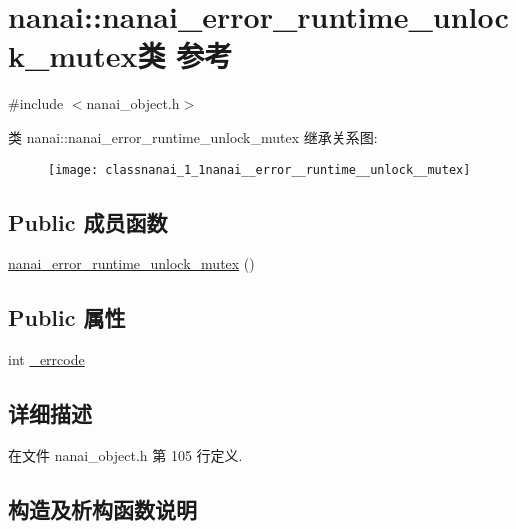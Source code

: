 \hypertarget{classnanai_1_1nanai__error__runtime__unlock__mutex}{}\section{nanai\+:\+:nanai\+\_\+error\+\_\+runtime\+\_\+unlock\+\_\+mutex类 参考}
\label{classnanai_1_1nanai__error__runtime__unlock__mutex}


{\ttfamily \#include $<$nanai\+\_\+object.\+h$>$}

类 nanai\+:\+:nanai\+\_\+error\+\_\+runtime\+\_\+unlock\+\_\+mutex 继承关系图\+:\begin{figure}[H]
\begin{center}
\leavevmode
\texttt{[image: classnanai\_1\_1nanai\_\_error\_\_runtime\_\_unlock\_\_mutex]}
\end{center}
\end{figure}
\subsection*{Public 成员函数}
\begin{DoxyCompactItemize}
\item 
\hyperlink{classnanai_1_1nanai__error__runtime__unlock__mutex_a7f077e10b1c5ecf91f7b001d4bf5436f}{nanai\+\_\+error\+\_\+runtime\+\_\+unlock\+\_\+mutex} ()
\end{DoxyCompactItemize}
\subsection*{Public 属性}
\begin{DoxyCompactItemize}
\item 
int \hyperlink{classnanai_1_1nanai__error__runtime__unlock__mutex_aba361f162e36f4a3a7d9028832bf65e6}{\+\_\+errcode}
\end{DoxyCompactItemize}


\subsection{详细描述}


在文件 nanai\+\_\+object.\+h 第 105 行定义.



\subsection{构造及析构函数说明}
\hypertarget{classnanai_1_1nanai__error__runtime__unlock__mutex_a7f077e10b1c5ecf91f7b001d4bf5436f}{}
